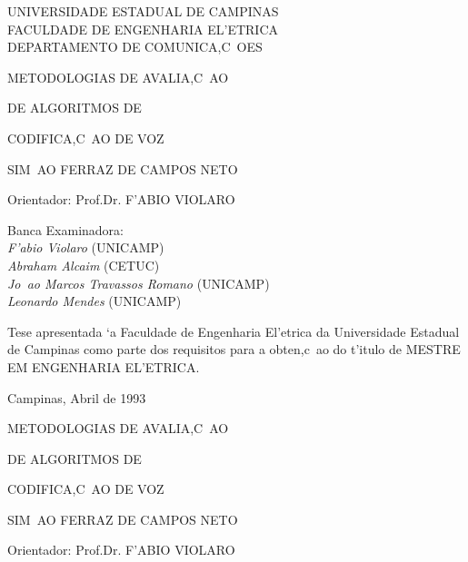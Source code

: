 
\thispagestyle{empty}
\begin{center}
	UNIVERSIDADE ESTADUAL DE CAMPINAS\\
	FACULDADE DE ENGENHARIA EL'ETRICA\\
	DEPARTAMENTO DE COMUNICA,C~OES


	{\Huge
		METODOLOGIAS DE AVALIA,C~AO 

		DE ALGORITMOS DE 

		CODIFICA,C~AO DE VOZ

	}

	SIM~AO FERRAZ DE CAMPOS NETO

	Orientador: Prof.Dr. F'ABIO VIOLARO

\end{center}


 \hfill  
	      \parbox[t]{80mm}{Banca Examinadora:\\
		{\em F'abio Violaro} ({\normalsize\sf UNICAMP})\\ 
		{\em Abraham Alcaim} ({\normalsize\sf CETUC})\\ 
		{\em Jo~ao Marcos Travassos Romano} ({\normalsize\sf UNICAMP})\\
		{\em Leonardo Mendes} ({\normalsize\sf UNICAMP})
	      }


 \hfill \parbox[t]{80mm}{Tese apresentada `a Faculdade de 
					 Engenharia El'etrica da
					 Universidade Estadual de
					 Campinas como parte dos
					 requisitos para a obten,c~ao
					 do t'itulo de MESTRE EM
					 ENGENHARIA EL'ETRICA.
					}

\vfill

\begin{center}
			Campinas, Abril de 1993
\end{center}

\dummypage
\newpage
\thispagestyle{empty}

\begin{center}


	{\Huge
		METODOLOGIAS DE AVALIA,C~AO 

		DE ALGORITMOS DE 

		CODIFICA,C~AO DE VOZ

	}

	SIM~AO FERRAZ DE CAMPOS NETO

	Orientador: Prof.Dr. F'ABIO VIOLARO

\end{center}

